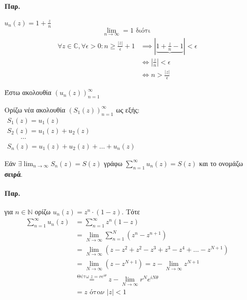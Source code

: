 \documentclass[12pt,a4paper,notitlepage,fleqn]{article}
\begin{document}
     \paragraph{Παρ.}
     \( u_n(z) = 1 +\frac{z}{n} \)
     \[ \lim_{n\to \infty} = 1 \text{ διότι } \]
     \begin{align*}
     \forall z\in\mathbb C , \forall \epsilon >0:
     n \geq \frac{|z|}{\epsilon}+1 &\implies \left|
     \underbrace{1+\frac{z}{n}-1}
     \right| < \epsilon \\ &\iff \left| \frac{z}{n} \right| < \epsilon
     \\ &\iff n> \frac{|z|}{\epsilon}
     \end{align*}
     \begin{defn*}{}
     	Έστω ακολουθία \( \left(u_n(z)\right)_{n=1}^\infty \)

     	Ορίζω νέα ακολουθία \( \left( S_1(z) \right)_{n=1}^\infty \)
     	ως εξής: \( \begin{array}{l}
     		S_1(z) = u_1(z) \\
     		S_2(z) = u_1(z)+u_2(z) \\
     		\qquad \cdots \qquad \\
     		S_n(z) = u_1(z)+u_2(z)+\dots+u_n(z)
     	\end{array} \)

     	Εάν \(\displaystyle \exists \lim_{n\to \infty} S_n(z) = S(z) \)
     	γράφω \( \displaystyle \sum_{n=1}^\infty u_n(z)=S(z) \) και το
     	ονομάζω \textbf{σειρά}.
     \end{defn*}

     \paragraph{Παρ.}
     για \( n\in\mathbb N \) ορίζω \( u_n(z)=z^n\cdot (1-z) \). Τότε
     \begin{align*}
     \sum_{n=1}^\infty u_n(z) &= \sum_{n=1}^\infty z^n(1-z)
     \\ &= \lim_{N\to \infty} \sum_{n=1}^N \left( z^n - z^{n+1} \right)
     \\ &= \lim_{N\to\infty}\left(z-z^2+z^2-z^3+z^3-z^4+\dots-z^{N+1}\right)
     \\ &= \lim_{N\to\infty}\left(z-z^{N+1}\right) = z-\lim_{N\to \infty} z^{N+1}
     \\ &\overset{\text{Θέτω } z=re^{i\theta}}{=} z-\lim_{N\to \infty} r^Ne^{iN\theta}
     \\ &= z \text{ όταν } |z|<1
     \end{align*}
\end{document}
